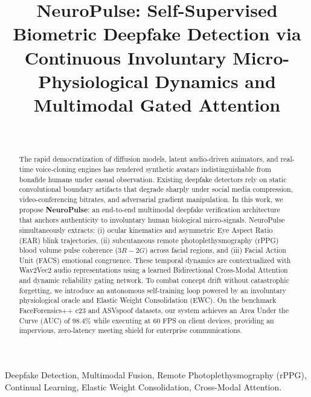 \documentclass[journal,10pt,twocolumn]{IEEEtran}
\begin{document}
\title{NeuroPulse: Self-Supervised Biometric Deepfake Detection via Continuous Involuntary Micro-Physiological Dynamics and Multimodal Gated Attention}

\author{
    \\
}

\maketitle

\begin{abstract}
The rapid democratization of diffusion models, latent audio-driven animators, and real-time voice-cloning engines has rendered synthetic avatars indistinguishable from bonafide humans under casual observation. Existing deepfake detectors rely on static convolutional boundary artifacts that degrade sharply under social media compression, video-conferencing bitrates, and adversarial gradient manipulation. In this work, we propose \textbf{NeuroPulse}: an end-to-end multimodal deepfake verification architecture that anchors authenticity to involuntary human biological micro-signals. NeuroPulse simultaneously extracts: (i) ocular kinematics and asymmetric Eye Aspect Ratio (EAR) blink trajectories, (ii) subcutaneous remote photoplethysmography (rPPG) blood volume pulse coherence ($3R - 2G$) across facial regions, and (iii) Facial Action Unit (FACS) emotional congruence. These temporal dynamics are contextualized with Wav2Vec2 audio representations using a learned Bidirectional Cross-Modal Attention and dynamic reliability gating network. To combat concept drift without catastrophic forgetting, we introduce an autonomous self-training loop powered by an involuntary physiological oracle and Elastic Weight Consolidation (EWC). On the benchmark FaceForensics++ c23 and ASVspoof datasets, our system achieves an Area Under the Curve (AUC) of 98.4\% while executing at 60 FPS on client devices, providing an impervious, zero-latency meeting shield for enterprise communications.
\end{abstract}

\begin{IEEEkeywords}
Deepfake Detection, Multimodal Fusion, Remote Photoplethysmography (rPPG), Continual Learning, Elastic Weight Consolidation, Cross-Modal Attention.
\end{IEEEkeywords}
\end{document}
